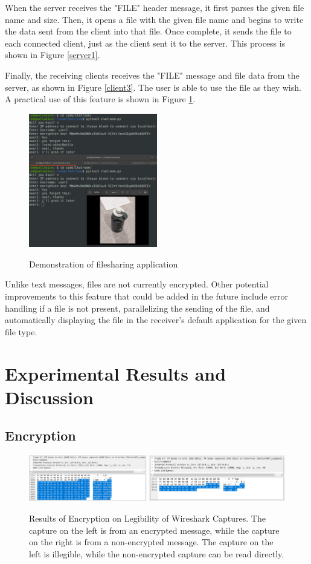 \documentclass{article}
\begin{document}
When the server receives the "FILE" header message, it first parses the given file name and size. Then, it opens a file with the given file name and begins to write the data sent from the client into that file. Once complete, it sends the file to each connected client, just as the client sent it to the server. This process is shown in Figure \ref{server1}.

Finally, the receiving clients receives the "FILE" message and file data from the server, as shown in Figure \ref{client3}. The user is able to use the file as they wish. A practical use of this feature is shown in Figure \ref{fileshareDemo}.

\begin{figure}[h]
\centering
\caption{Demonstration of filesharing application}
\includegraphics[width=0.5\textwidth]{media/fileshareDemo.png}
\label{fileshareDemo}
\end{figure}

Unlike text messages, files are not currently encrypted. Other potential improvements to this feature that could be added in the future include error handling if a file is not present, parallelizing the sending of the file, and automatically displaying the file in the receiver's default application for the given file type.

\section{Experimental Results and Discussion}

\subsection{Encryption}

\begin{figure}[h]
\centering
\includegraphics[width=1\textwidth]{media/WiresharkEncryptionResults.PNG}
\label{Encryption Wireshark Results}
\caption{Results of Encryption on Legibility of Wireshark Captures. The capture on the left is from an encrypted message, while the capture on the right is from a non-encrypted message. The capture on the left is illegible, while the non-encrypted capture can be read directly.}
\end{figure}
\end{document}
